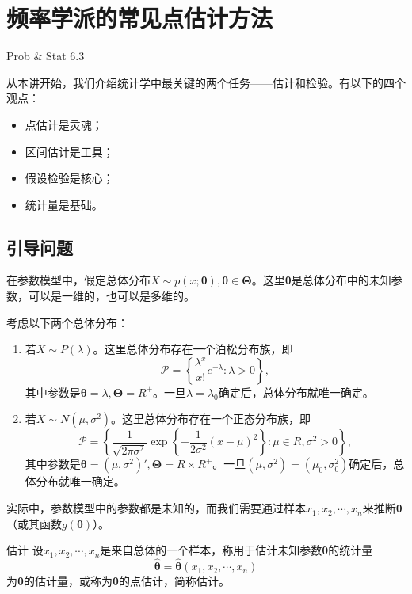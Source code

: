 \chapter{频率学派的常见点估计方法}
\begin{introduction}
  \item Prob $\&$ Stat 6.3
\end{introduction}
从本讲开始，我们介绍统计学中最关键的两个任务——估计和检验。有以下的四个观点：
\begin{itemize}
    \item 点估计是灵魂；
    \item 区间估计是工具；
    \item 假设检验是核心；
    \item 统计量是基础。
\end{itemize}

\section{引导问题}
在参数模型中，假定总体分布$X\sim p(x;\bm{\theta}),\bm{\theta}\in \bm{\Theta}$。这里$\bm{\theta}$是总体分布中的未知参数，可以是一维的，也可以是多维的。
\begin{example}
考虑以下两个总体分布：
\begin{enumerate}
\item 若$X \sim P(\lambda)$。这里总体分布存在一个泊松分布族，即
    $$
    \mathcal{P} = \left\{\frac{\lambda^x}{x!}e^{-\lambda}: \lambda > 0\right\},
    $$
    其中参数是$\bm{\theta} = \lambda, \bm{\Theta} = R^{+}$。一旦$\lambda = \lambda_0$确定后，总体分布就唯一确定。
    \item 若$X \sim N(\mu,\sigma^2)$。这里总体分布存在一个正态分布族，即
    $$
    \mathcal{P} = \left\{\frac{1}{\sqrt{2\pi \sigma^2}}\exp\left\{-\frac{1}{2\sigma^2}(x-\mu)^2\right\}: \mu \in R, \sigma^2 > 0\right\},
    $$
    其中参数是$\bm{\theta} = (\mu,\sigma^2)', \bm{\Theta} = R\times R^{+}$。一旦$(\mu,\sigma^2) = (\mu_0,\sigma_0^2)$确定后，总体分布就唯一确定。
\end{enumerate}
\end{example}

实际中，参数模型中的参数都是未知的，而我们需要通过样本$x_1,x_2,\cdots,x_n$来推断$\bm{\theta}$（或其函数$g(\bm{\theta})$）。

\begin{definition}{估计}
设$x_1,x_2,\cdots,x_n$是来自总体的一个样本，称用于估计未知参数$\bm{\theta}$的统计量
$$
\hat{\bm{\theta}} = \hat{\bm{\theta}}(x_1,x_2,\cdots,x_n)
$$
为$\bm{\theta}$的估计量，或称为$\bm{\theta}$的点估计，简称估计。
\end{definition}


